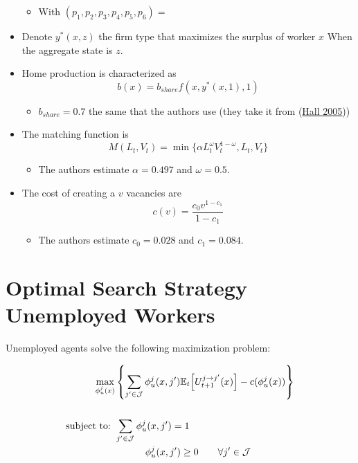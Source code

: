 \documentclass[
  letterpaper,
  DIV=11,
  numbers=noendperiod]{scrreprt}
\providecommand{\tightlist}{%
  \setlength{\itemsep}{0pt}\setlength{\parskip}{0pt}}\usepackage{longtable,booktabs,array}
\begin{document}
\begin{itemize}
  \begin{itemize}
  \tightlist
  \item
    With \((p_1, p_2, p_3, p_4, p_5, p_6) =\)
  \end{itemize}
\item
  Denote \(y^*(x,z)\) the firm type that maximizes the surplus of worker
  \(x\) When the aggregate state is \(z\).
\item
  Home production is characterized as
  \[b(x) = b_{share} f(x,y^*(x,1),1)\]

  \begin{itemize}
  \tightlist
  \item
    \(b_{share} = 0.7\) the same that the authors use (they take it from
    (\protect\hyperlink{ref-hallEmploymentFluctuationsEquilibrium2005}{Hall
    2005}))
  \end{itemize}
\item
  The matching function is
  \[M(L_t, V_t) = \min\{\alpha L_t^{\omega}V_t^{1-\omega}, L_t, V_t\}\]

  \begin{itemize}
  \tightlist
  \item
    The authors estimate \(\alpha = 0.497\) and \(\omega=0.5\).
  \end{itemize}
\item
  The cost of creating a \(v\) vacancies are
  \[c(v) = \frac{c_0 v^{1-c_1}}{1 - c_1}\]

  \begin{itemize}
  \tightlist
  \item
    The authors estimate \(c_0 = 0.028\) and \(c_1 = 0.084\).
  \end{itemize}
\end{itemize}

\cleardoublepage
{}
{}
\appendix

\hypertarget{sec-appendix_search_unemp}{%
\chapter{Optimal Search Strategy Unemployed
Workers}\label{sec-appendix_search_unemp}}

Unemployed agents solve the following maximization problem:

\begin{align*}
    \max_{\phi^j_u(x)}&\left\{ \sum_{j'\in\mathcal{J}}\phi^j_u(x, j')\mathbb{E}_t\Big[U^{j \to j'}_{t+1}(x)  \Big] -c(\phi^j_u(x)) \right\} \\ \\
    \text{subject to: } & \sum_{j'\in \mathcal{J}}\phi^j_u(x, j') = 1 \\
    & \hspace{1.1 cm} \phi^j_u(x, j') \geq 0 \qquad \forall j'\in \mathcal{J}
\end{align*}
\end{document}
